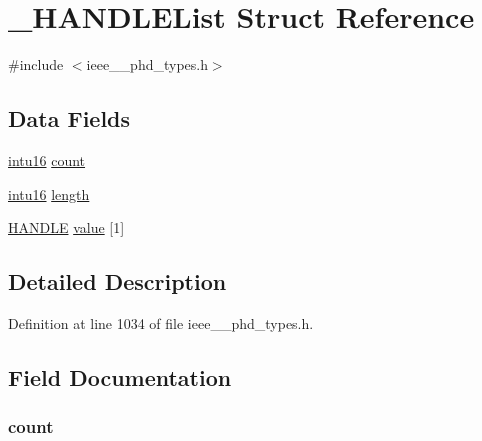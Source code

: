 \hypertarget{struct___h_a_n_d_l_e_list}{}\section{\+\_\+\+H\+A\+N\+D\+L\+E\+List Struct Reference}
\label{struct___h_a_n_d_l_e_list}


{\ttfamily \#include $<$ieee\+\_\+\_\+phd\+\_\+types.\+h$>$}

\subsection*{Data Fields}
\begin{DoxyCompactItemize}
\item 
\hyperlink{ieee__11073__phd__types_8h_a3561595d2aa7416532e1c9910abd076d}{intu16} \hyperlink{struct___h_a_n_d_l_e_list_abf6db060ae8e224764b0f867fb135ecd}{count}
\item 
\hyperlink{ieee__11073__phd__types_8h_a3561595d2aa7416532e1c9910abd076d}{intu16} \hyperlink{struct___h_a_n_d_l_e_list_a3743679e4ff85e3e1b3fc2e59973fbb3}{length}
\item 
\hyperlink{ieee__11073__phd__types_8h_a76f0d44d294babf2e568f7ee676ffca6}{H\+A\+N\+D\+L\+E} \hyperlink{struct___h_a_n_d_l_e_list_a7af628899ae1889349ae5fa82741c483}{value} \mbox{[}1\mbox{]}
\end{DoxyCompactItemize}


\subsection{Detailed Description}


Definition at line 1034 of file ieee\+\_\+\_\+phd\+\_\+types.\+h.



\subsection{Field Documentation}
\hypertarget{struct___h_a_n_d_l_e_list_abf6db060ae8e224764b0f867fb135ecd}{}
\subsubsection[{count}]{ count}\label{struct___h_a_n_d_l_e_list_abf6db060ae8e224764b0f867fb135ecd}


